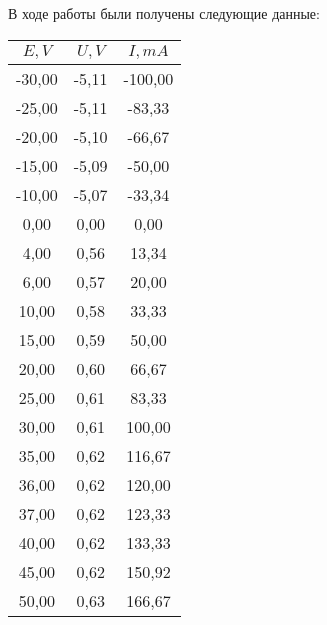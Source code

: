 \documentclass[12pt]{article}
\begin{document}
    В ходе работы были получены следующие данные:

    \begin{table}[ht]
        \centering
        \begin{tabular}{|c|c|c|}
            \hline
            $E, V$ & $U, V$ & $I, mA$ \\
            \hline
            -30,00 & -5,11 & -100,00 \\
            \hline
            -25,00 & -5,11 & -83,33 \\
            \hline
            -20,00 & -5,10 & -66,67 \\
            \hline
            -15,00 & -5,09 & -50,00 \\
            \hline
            -10,00 & -5,07 & -33,34 \\
            \hline
            0,00 & 0,00 & 0,00 \\
            \hline
            4,00 & 0,56 & 13,34 \\
            \hline
            6,00 & 0,57 & 20,00 \\
            \hline
            10,00 & 0,58 & 33,33 \\
            \hline
            15,00 & 0,59 & 50,00 \\
            \hline
            20,00 & 0,60 & 66,67 \\
            \hline
            25,00 & 0,61 & 83,33 \\
            \hline
            30,00 & 0,61 & 100,00 \\
            \hline
            35,00 & 0,62 & 116,67 \\
            \hline
            36,00 & 0,62 & 120,00 \\
            \hline
            37,00 & 0,62 & 123,33 \\
            \hline
            40,00 & 0,62 & 133,33 \\
            \hline
            45,00 & 0,62 & 150,92 \\
            \hline
            50,00 & 0,63 & 166,67 \\
            \hline
        \end{tabular}
    \end{table}

    \newpage
\end{document}
